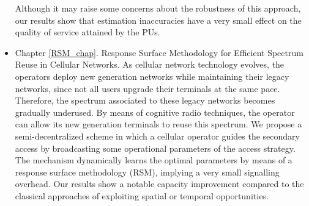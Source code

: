 \begin{itemize}
Although it may raise some concerns about the robustness of this approach, our results show that estimation inaccuracies have a very small effect on the quality of service attained by the PUs.
\item Chapter \ref{RSM_chap}. Response Surface Methodology for Efficient Spectrum Reuse in Cellular Networks.
As cellular network technology evolves, the operators deploy new generation networks while maintaining their legacy networks, since not all users upgrade their terminals at the same pace.
Therefore, the spectrum associated to these legacy networks becomes gradually underused.
By means of cognitive radio techniques, the operator can allow its new generation terminals to reuse this spectrum.
We propose a semi-decentralized scheme in which a cellular operator guides the secondary access by broadcasting some operational parameters of the access strategy.
The mechanism dynamically learns the optimal parameters by means of a response surface methodology (RSM), implying a very small signalling overhead.
Our results show a notable capacity improvement compared to the classical approaches of exploiting spatial or temporal opportunities.
\end{itemize}  

